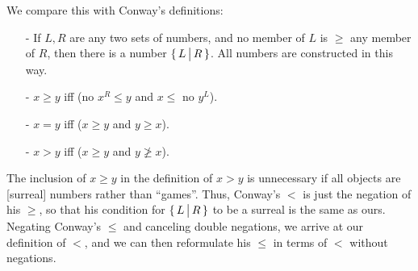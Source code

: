 \noindent
We compare this with Conway's definitions:
\begin{itemize}\footnotesize
\item[-] If $L,R$ are any two sets of numbers, and no member of $L$ is $\ge$ any member of $R$, then there is a number $\{\,L\,\big|\,R\,\}$.
  All numbers are constructed in this way.
\item[-] $x\ge y$ iff (no $x^R\le y$ and $x\le$ no $y^L$).
\item[-] $x=y$ iff ($x \ge y$ and $y\ge x$).
\item[-] $x>y$ iff ($x\ge y$ and $y\not\ge x$).
\end{itemize}
The inclusion of $x\ge y$ in the definition of $x>y$ is unnecessary if all objects are [surreal] numbers rather than ``games''.
Thus, Conway's $<$ is just the negation of his $\ge$, so that his condition for $\{\,L\,\big|\,R\,\}$ to be a surreal is the same as ours.
Negating Conway's $\le$ and canceling double negations, we arrive at our definition of $<$, and we can then reformulate his $\le$ in terms of $<$ without negations.

